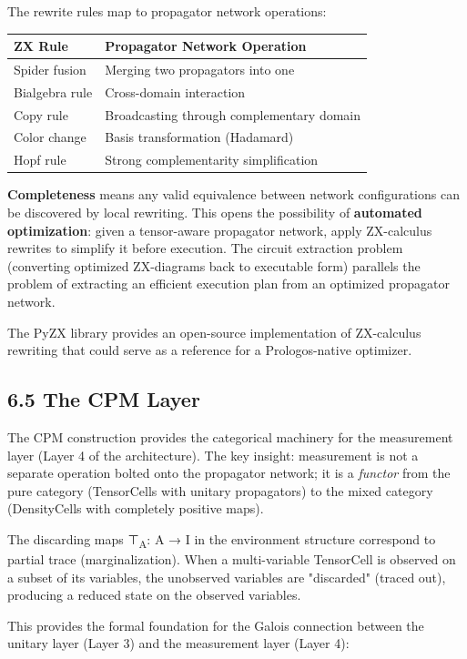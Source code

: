 \documentclass[11pt]{article}
\begin{document}
The rewrite rules map to propagator network operations:

\begin{center}
\begin{tabular}{ll}
ZX Rule & Propagator Network Operation\\
\hline
Spider fusion & Merging two propagators into one\\
Bialgebra rule & Cross-domain interaction\\
Copy rule & Broadcasting through complementary domain\\
Color change & Basis transformation (Hadamard)\\
Hopf rule & Strong complementarity simplification\\
\end{tabular}
\end{center}

\textbf{Completeness} means any valid equivalence between network configurations can be
discovered by local rewriting. This opens the possibility of \textbf{automated
optimization}: given a tensor-aware propagator network, apply ZX-calculus rewrites
to simplify it before execution. The circuit extraction problem (converting
optimized ZX-diagrams back to executable form) parallels the problem of extracting
an efficient execution plan from an optimized propagator network.

The PyZX library provides an open-source implementation of ZX-calculus rewriting
that could serve as a reference for a Prologos-native optimizer.
\subsection{6.5 The CPM Layer}
\label{sec:orgcc191ca}

The CPM construction provides the categorical machinery for the measurement
layer (Layer 4 of the architecture). The key insight: measurement is not a
separate operation bolted onto the propagator network; it is a \emph{functor}
from the pure category (TensorCells with unitary propagators) to the mixed
category (DensityCells with completely positive maps).

The discarding maps ⊤\textsubscript{A}: A → I in the environment structure correspond to
partial trace (marginalization). When a multi-variable TensorCell is observed
on a subset of its variables, the unobserved variables are "discarded" (traced
out), producing a reduced state on the observed variables.

This provides the formal foundation for the Galois connection between the
unitary layer (Layer 3) and the measurement layer (Layer 4):
\end{document}
